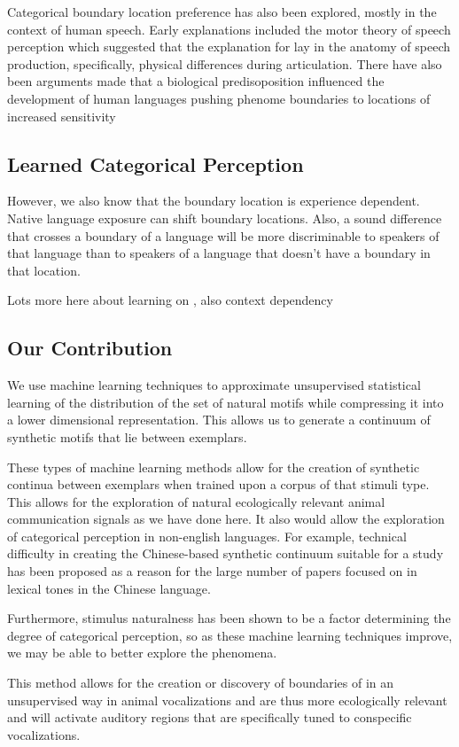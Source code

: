 Categorical boundary location preference has also been explored, mostly in the context of human speech. Early explanations included the motor theory of speech perception which suggested that the explanation for \CP lay in the anatomy of speech production, specifically, physical differences during articulation\cite{liberman1967perception}. There have also been arguments made that a biological predisoposition influenced the development of human languages pushing phenome boundaries to locations of increased sensitivity\cite{stevens1981constraints, goldstone2010categorical, halle1979some}

\subsection{Learned Categorical Perception}

However, we also know that the boundary location is experience dependent. Native language exposure can shift boundary locations. Also, a sound difference that crosses a boundary of a language will be more discriminable to speakers of that language than to speakers of a language that doesn’t have a boundary in that location.

Lots more here about learning on \CP, also context dependency

\subsection{Our Contribution}
We use machine learning techniques to approximate unsupervised statistical learning of the distribution of the set of natural motifs while compressing it into a lower dimensional representation. This allows us to generate a continuum of synthetic motifs that lie between exemplars.

These types of machine learning methods allow for the creation of synthetic continua between exemplars when trained upon a corpus of that stimuli type. This allows for the exploration of natural ecologically relevant animal communication signals as we have done here. It also would allow the exploration of categorical perception in non-english languages. For example, technical difficulty in creating the Chinese-based synthetic continuum suitable for a \CP study has been proposed as a reason for the large number of papers focused on \CP in lexical tones in the Chinese language\cite{zhang2013categorical}.

Furthermore, stimulus naturalness has been shown to be a factor determining the degree of categorical perception, so as these machine learning techniques improve, we may be able to better explore the \CP phenomena.

This method allows for the creation or discovery of boundaries of \CP in an unsupervised way in animal vocalizations and are thus more ecologically relevant and will activate auditory regions that are specifically tuned to conspecific vocalizations.